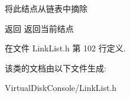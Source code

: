 将此结点从链表中摘除 

\begin{DoxyReturn}{返回}
返回当前结点 
\end{DoxyReturn}


在文件 Link\-List.\-h 第 102 行定义.



该类的文档由以下文件生成\-:\begin{DoxyCompactItemize}
\item 
Virtual\-Disk\-Console/Link\-List.\-h\end{DoxyCompactItemize}
